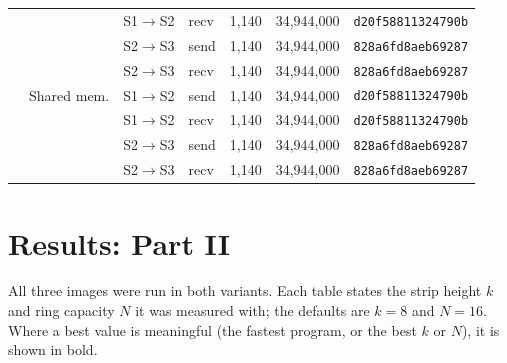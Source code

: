 \documentclass[11pt,a4paper]{article}
\newcommand{\cfgK}{8}
\newcommand{\cfgRing}{16}
\begin{document}
\begin{table}[htbp]
{\begin{tabular}{llllrrl}
 &  & S1$\to$S2 & recv & 1{,}140 & 34{,}944{,}000 & \texttt{d20f58811324790b} \\
 &  & S2$\to$S3 & send & 1{,}140 & 34{,}944{,}000 & \texttt{828a6fd8aeb69287} \\
 &  & S2$\to$S3 & recv & 1{,}140 & 34{,}944{,}000 & \texttt{828a6fd8aeb69287} \\
\addlinespace
2 & Shared mem. & S1$\to$S2 & send & 1{,}140 & 34{,}944{,}000 & \texttt{d20f58811324790b} \\
 &  & S1$\to$S2 & recv & 1{,}140 & 34{,}944{,}000 & \texttt{d20f58811324790b} \\
 &  & S2$\to$S3 & send & 1{,}140 & 34{,}944{,}000 & \texttt{828a6fd8aeb69287} \\
 &  & S2$\to$S3 & recv & 1{,}140 & 34{,}944{,}000 & \texttt{828a6fd8aeb69287} \\
\bottomrule
\end{tabular}}
\end{table}

\section{Results: Part II}
\label{sec:results2}
All three images were run in both variants. Each table states the strip height $k$ and ring
capacity $N$ it was measured with; the defaults are $k=\cfgK$ and $N=\cfgRing$. Where a best
value is meaningful (the fastest program, or the best $k$ or $N$), it is shown in bold.
\end{document}
